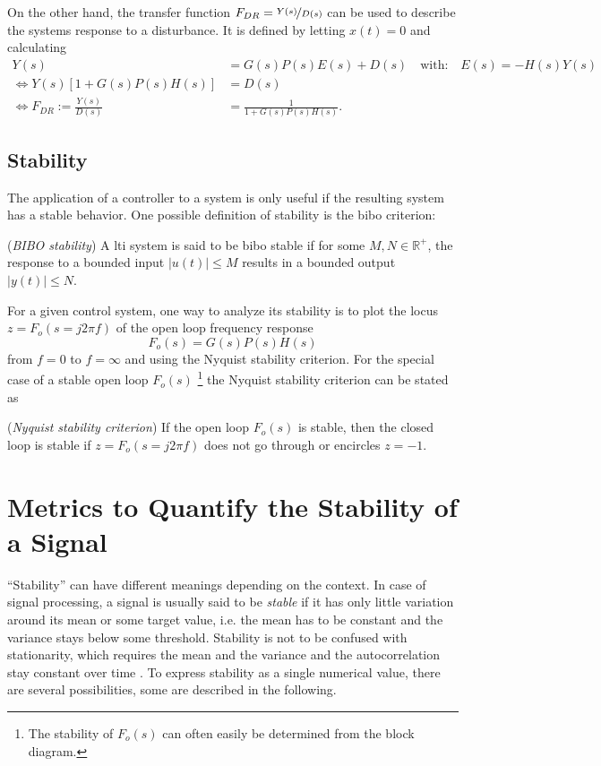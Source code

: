 On the other hand, the transfer function $F_{DR}=\nicefrac{Y(s)}{D(s)}$ can be used to describe the systems response to a disturbance.\cite[p.~88]{Foellinger2016} It is defined by letting $x(t)=0$ and calculating
\begin{align}\label{eq:disturbanceRejection}
Y(s)&=G(s)P(s)E(s)+D(s)\quad\text{with:}\quad E(s)=-H(s)Y(s)\\
\Leftrightarrow Y(s)\left[1+G(s)P(s)H(s)\right]&=D(s)\\
\Leftrightarrow F_{DR}:=\frac{Y(s)}{D(s)}&=\frac{1}{1+G(s)P(s)H(s)}.
\end{align}

\subsection{Stability}
The application of a controller to a system is only useful if the resulting system has a stable behavior.
One possible definition of stability is the \gls{bibo} criterion\cite[p.~82]{Foellinger2016}:
\begin{definition}\label{def:bibo}
(\textit{BIBO stability}) A \gls{lti} system is said to be \gls{bibo} stable if for some $M,N \in \mathbb{R}^+$, the response to a bounded input $|u(t)| \le M$ results in a bounded output $|y(t)| \le N$.
\end{definition}

For a given control system, one way to analyze its stability is to plot the locus $z=F_o(s=j2\pi f)$ of the open loop frequency response
\begin{equation}
F_o(s) = G(s)P(s)H(s)
\end{equation}
from $f=0$ to $f=\infty$ and using the Nyquist stability criterion.
For the special case of a stable open loop $F_o(s)$ \footnote{The stability of $F_o(s)$ can often easily be determined from the block diagram.} the Nyquist stability criterion can be stated as\cite[p.~111]{Foellinger2016}
\begin{definition}\label{def:Nyquist}
(\textit{Nyquist stability criterion}) If the open loop $F_o(s)$ is stable, then the closed loop is stable if $z=F_o(s=j2\pi f)$ does not go through or encircles $z=-1$.
\end{definition}


\section{Metrics to Quantify the Stability of a Signal}\label{sec:metrics}
``Stability'' can have different meanings depending on the context. In case of signal processing, a signal is usually said to be \textit{stable} if it has only little variation around its mean or some target value, i.e. the mean has to be constant and the variance stays below some threshold. 
Stability is not to be confused with stationarity, which requires the mean and the variance and the autocorrelation stay constant over time \cite{Guthrie2020}. To express stability as a single numerical value, there are several possibilities, some are described in the following.

